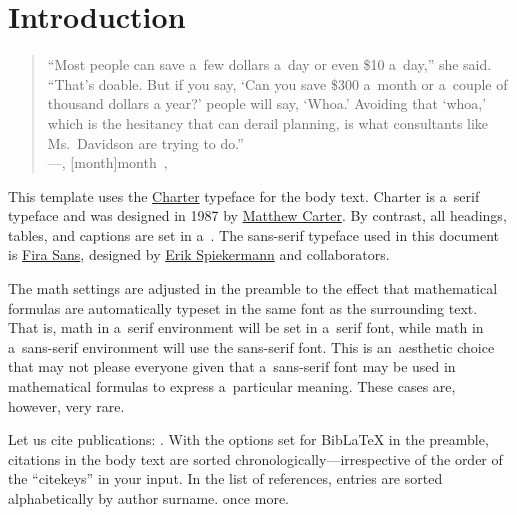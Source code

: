\renewcommand{\blindmarkup}[1]{\emph{#1}}
\blindmathfalse


\section{Introduction}
\label{sec:introduction}

\begin{quote}
``Most people can save a~few dollars a~day or even \$10 a~day,'' she said. ``That’s doable. But if you say, `Can you save \$300 a~month or a~couple of thousand dollars a year?' people will say, `Whoa.' Avoiding that `whoa,' which is the hesitancy that can derail planning, is what consultants like Ms.~Davidson are trying to do.'' \\
\upshape
\mbox{}\hfill---\textit{}, [month]{month}~, 
\end{quote}

%
%
%
%
%

This template uses the \href{https://en.wikipedia.org/wiki/Bitstream_Charter}{Charter} typeface for the body text. Charter is a~serif type\-face and was designed in 1987 by \href{https://en.wikipedia.org/wiki/Matthew_Carter}{Matthew Carter}. By contrast, all headings, tables, and captions are set in a~. The sans-serif typeface used in this document is \href{https://en.wikipedia.org/wiki/Fira_Sans}{Fira Sans}, designed by \href{https://en.wikipedia.org/wiki/Erik_Spiekermann}{Erik Spiekermann} and collaborators.

The math settings are adjusted in the preamble to the effect that mathematical formulas are automatically typeset in the same font as the surrounding text. That is, math in a~serif environment will be set in a~serif font, while math in a~sans-serif environment will use the sans-serif font. This is an~aesthetic choice that may not please everyone given that a~sans-serif font may be used in mathematical formulas to express a~particular meaning. These cases are, however, very rare.

Let us cite  publications: \cite{Andersen2008, Andreoni2012, Balakrishnan2016, Lisi1995}. With the options set for BibLaTeX in the preamble, citations in the body text are sorted chronologically---irrespective of the order of the ``citekeys'' in your input. In the list of references, entries are sorted alphabetically by author surname. \cite{Andersen2008} once more.

